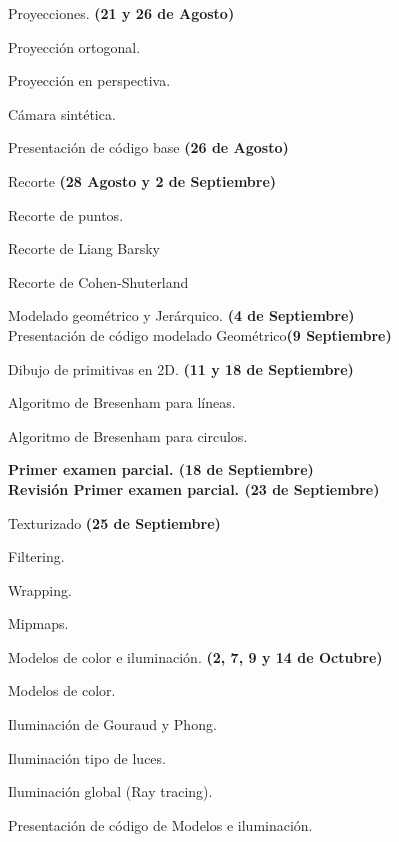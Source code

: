 \documentclass[a4paper,11pt]{article}
\theoremstyle{mytheor}
\begin{document}
\begin{legal}
\begin{legal}
		\item Proyecciones. \textbf{(21 y 26 de Agosto)}
		\begin{legal}
			\item Proyección ortogonal.
			\item Proyección en perspectiva.
			\item Cámara sintética.
		\end{legal}
		Presentación de código base \textbf{(26 de Agosto)}
		\item Recorte \textbf{(28 Agosto y 2 de Septiembre)}
		\begin{legal}
			\item Recorte de puntos.
			\item Recorte de Liang Barsky
			\item Recorte de Cohen-Shuterland
		\end{legal}
	\end{legal}
	\item Modelado geométrico y Jerárquico. \textbf{(4 de Septiembre)}
	\\ Presentación de código modelado Geométrico\textbf{(9 Septiembre)}
	\item Dibujo de primitivas en 2D. \textbf{(11 y 18 de Septiembre)}
	\begin{legal}
		\item Algoritmo de Bresenham para líneas.
		\item Algoritmo de Bresenham para circulos.
	\end{legal}
	\textbf{Primer examen parcial. (18 de Septiembre)} \\
	\textbf{Revisión Primer examen parcial. (23 de Septiembre)}
	\item Texturizado \textbf{(25 de Septiembre)}
	\begin{legal}
		\item Filtering.
		\item Wrapping.
		\item Mipmaps.
	\end{legal}
	\item Modelos de color e iluminación. \textbf{(2, 7, 9 y 14 de Octubre)}
	\begin{legal}
		\item Modelos de color.
		\item Iluminación de Gouraud y Phong.
		\item Iluminación tipo de luces.
		\item Iluminación global (Ray tracing).
		\item Presentación de código de Modelos e iluminación.

\end{legal}
\end{legal}
\end{document}
